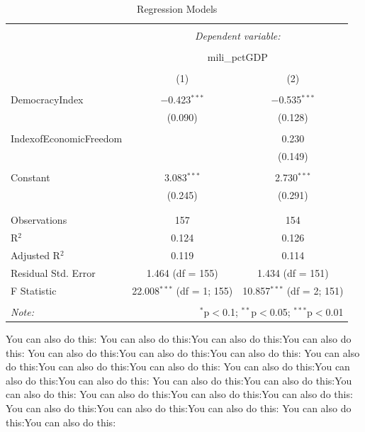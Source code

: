 \documentclass[11pt]{article}
\begin{document}
\begin{table}[!htbp] \centering 
  \caption{Regression Models} 
  \label{regs1} 
\begin{tabular}{@{\extracolsep{5pt}}lcc} 
\\[-1.8ex]\hline 
\hline \\[-1.8ex] 
 & \multicolumn{2}{c}{\textit{Dependent variable:}} \\ 
\cline{2-3} 
\\[-1.8ex] & \multicolumn{2}{c}{mili\_pctGDP} \\ 
\\[-1.8ex] & (1) & (2)\\ 
\hline \\[-1.8ex] 
 DemocracyIndex & $-$0.423$^{***}$ & $-$0.535$^{***}$ \\ 
  & (0.090) & (0.128) \\ 
  & & \\ 
 IndexofEconomicFreedom &  & 0.230 \\ 
  &  & (0.149) \\ 
  & & \\ 
 Constant & 3.083$^{***}$ & 2.730$^{***}$ \\ 
  & (0.245) & (0.291) \\ 
  & & \\ 
\hline \\[-1.8ex] 
Observations & 157 & 154 \\ 
R$^{2}$ & 0.124 & 0.126 \\ 
Adjusted R$^{2}$ & 0.119 & 0.114 \\ 
Residual Std. Error & 1.464 (df = 155) & 1.434 (df = 151) \\ 
F Statistic & 22.008$^{***}$ (df = 1; 155) & 10.857$^{***}$ (df = 2; 151) \\ 
\hline 
\hline \\[-1.8ex] 
\textit{Note:}  & \multicolumn{2}{r}{$^{*}$p$<$0.1; $^{**}$p$<$0.05; $^{***}$p$<$0.01} \\ 
\end{tabular} 
\end{table} 

You can also do this: You can also do this:You can also do this:You can also do this: You can also do this:You can also do this:You can also do this: You can also do this:You can also do this:You can also do this: You can also do this:You can also do this:You can also do this: You can also do this:You can also do this:You can also do this: You can also do this:You can also do this:You can also do this: You can also do this:You can also do this:You can also do this: You can also do this:You can also do this:
\pagebreak
\end{document}
